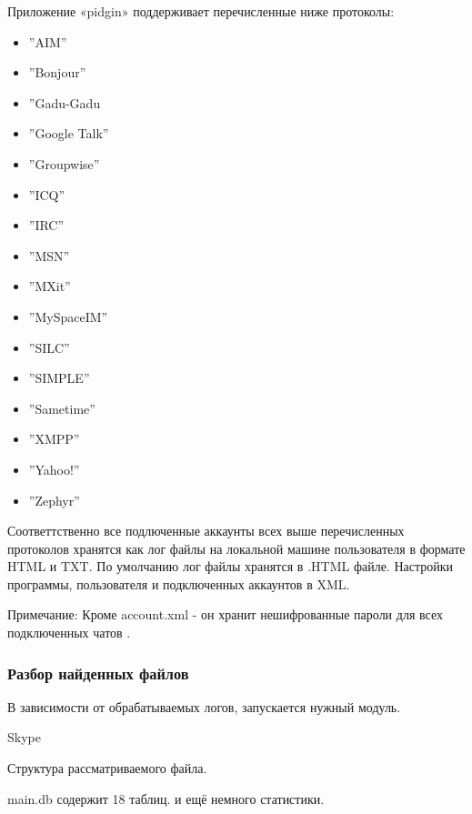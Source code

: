 Приложение «pidgin» поддерживает перечисленные ниже протоколы: \cite{ofpidgin}

\begin{itemize}
\item''AIM''
\item''Bonjour''
\item''Gadu-Gadu
\item''Google Talk''
\item''Groupwise''
\item''ICQ''
\item''IRC''
\item''MSN''
\item''MXit''
\item''MySpaceIM''
\item''SILC''
\item''SIMPLE''
\item''Sametime''
\item''XMPP''
\item''Yahoo!''
\item''Zephyr''
\end{itemize}

Соответтственно все подлюченные аккаунты всех выше перечисленных протоколов хранятся как лог файлы на локальной машине пользователя в формате HTML и TXT. По умолчанию лог файлы хранятся в .HTML файле. Настройки программы, пользователя и подключенных аккаунтов в XML.

Примечание: Кроме account.xml - он хранит нешифрованные пароли для всех подключенных чатов \cite{ofpidgin}.

\subsubsection{Разбор найденных файлов}

В зависимости от обрабатываемых логов, запускается нужный модуль. 

Skype

Структура рассматриваемого файла.

main.db  содержит 18 таблиц. и ещё немного статистики.

